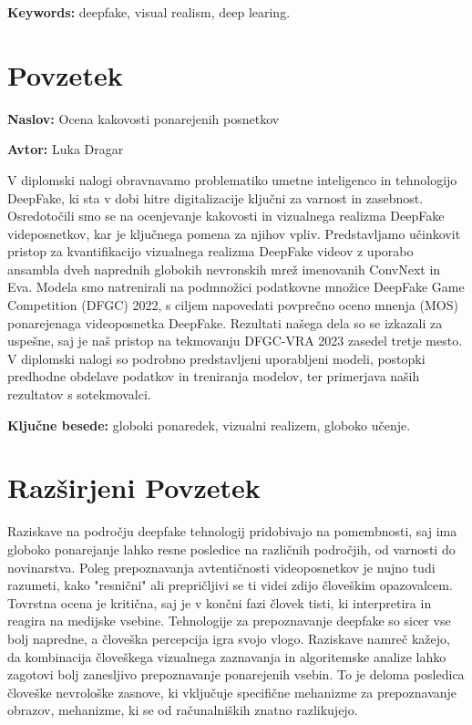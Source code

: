 \documentclass[a4paper,12pt,openright]{book}
\newcommand{\ttitle}{Ocena kakovosti ponarejenih posnetkov}
\newcommand{\tauthor}{Luka Dragar}
\newcommand{\tkeywords}{globoki ponaredek, vizualni realizem, globoko učenje}
\newcommand{\tkeywordsEn}{deepfake, visual realism, deep learing}
\newcommand{\clearemptydoublepage}{\newpage{\pagestyle{empty}\cleardoublepage}}
\begin{document}
\bigskip

\noindent\textbf{Keywords:} \tkeywordsEn.
\clearemptydoublepage

{}
\chapter*{Povzetek}

\noindent\textbf{Naslov:} \ttitle
\bigskip

\noindent\textbf{Avtor:} \tauthor
\bigskip

\noindent V diplomski nalogi obravnavamo problematiko umetne inteligenco in tehnologijo DeepFake, ki sta v dobi hitre digitalizacije ključni za varnost in zasebnost. Osredotočili smo se na ocenjevanje kakovosti in vizualnega realizma DeepFake videposnetkov, kar je ključnega pomena za njihov vpliv. Predstavljamo učinkovit pristop za kvantifikacijo vizualnega realizma DeepFake videov z uporabo ansambla dveh naprednih globokih nevronskih mrež imenovanih ConvNext in Eva. Modela smo natrenirali na podmnožici podatkovne množice DeepFake Game Competition (DFGC) 2022, s ciljem napovedati povprečno oceno mnenja (MOS) ponarejenaga videoposnetka DeepFake. Rezultati našega dela so se izkazali za uspešne, saj je naš pristop na tekmovanju DFGC-VRA 2023 zasedel tretje mesto. V diplomski nalogi so podrobno predstavljeni uporabljeni modeli, postopki predhodne obdelave podatkov in treniranja modelov, ter primerjava naših rezultatov s sotekmovalci.

\bigskip

\noindent\textbf{Ključne besede:} \tkeywords.
\clearemptydoublepage


{}
\chapter*{Razširjeni Povzetek}
Raziskave na področju deepfake tehnologij pridobivajo na pomembnosti, saj ima globoko ponarejanje lahko resne posledice na različnih področjih, od varnosti do novinarstva. Poleg prepoznavanja avtentičnosti videoposnetkov je nujno tudi razumeti, kako "resnični" ali prepričljivi se ti videi zdijo človeškim opazovalcem. Tovrstna ocena je kritična, saj je v končni fazi človek tisti, ki interpretira in reagira na medijske vsebine. Tehnologije za prepoznavanje deepfake so sicer vse bolj napredne, a človeška percepcija igra svojo vlogo. Raziskave namreč kažejo, da kombinacija človeškega vizualnega zaznavanja in algoritemske analize lahko zagotovi bolj zanesljivo prepoznavanje ponarejenih vsebin. To je deloma posledica človeške nevrološke zasnove, ki vključuje specifične mehanizme za prepoznavanje obrazov, mehanizme, ki se od računalniških znatno razlikujejo. 
\end{document}
